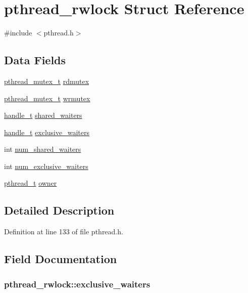 \hypertarget{structpthread__rwlock}{\section{pthread\+\_\+rwlock Struct Reference}
\label{structpthread__rwlock}
}


{\ttfamily \#include $<$pthread.\+h$>$}

\subsection*{Data Fields}
\begin{DoxyCompactItemize}
\item 
\hyperlink{pthread_8h_ad613e9ad2d8d9713a8440618e7a70bba}{pthread\+\_\+mutex\+\_\+t} \hyperlink{structpthread__rwlock_aa525fa5ae59171418ede7d1894bf21fe}{rdmutex}
\item 
\hyperlink{pthread_8h_ad613e9ad2d8d9713a8440618e7a70bba}{pthread\+\_\+mutex\+\_\+t} \hyperlink{structpthread__rwlock_acebaf123f0d451e8aa6e7734c6bcca5b}{wrmutex}
\item 
\hyperlink{pthread_8h_aea4188cfb1472f9bb606fd2566133e34}{handle\+\_\+t} \hyperlink{structpthread__rwlock_a513e968cb2dea01c044a3304c26b1d07}{shared\+\_\+waiters}
\item 
\hyperlink{pthread_8h_aea4188cfb1472f9bb606fd2566133e34}{handle\+\_\+t} \hyperlink{structpthread__rwlock_ae49a53d46712b0d4af191e85a622da1d}{exclusive\+\_\+waiters}
\item 
int \hyperlink{structpthread__rwlock_af637581bd0ea0328763d041937160fff}{num\+\_\+shared\+\_\+waiters}
\item 
int \hyperlink{structpthread__rwlock_a5d8b56e7998376aa9f5908a560daadb7}{num\+\_\+exclusive\+\_\+waiters}
\item 
\hyperlink{pthread_8h_a6766c2345d5c6fe6407d9f6b844e584a}{pthread\+\_\+t} \hyperlink{structpthread__rwlock_a7918a35d8e929df9c7f1fd9f12e9efcf}{owner}
\end{DoxyCompactItemize}


\subsection{Detailed Description}


Definition at line 133 of file pthread.\+h.



\subsection{Field Documentation}
\hypertarget{structpthread__rwlock_ae49a53d46712b0d4af191e85a622da1d}{
\subsubsection[{exclusive\+\_\+waiters}]{ pthread\+\_\+rwlock\+::exclusive\+\_\+waiters}}\label{structpthread__rwlock_ae49a53d46712b0d4af191e85a622da1d}


